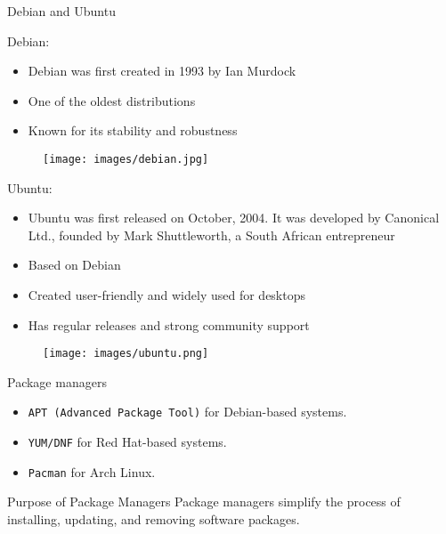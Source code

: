 \documentclass{beamer}
\begin{document}
\begin{frame}{Debian and Ubuntu}
  \begin{minipage}[t]{0.65\textwidth}
    Debian:
    \begin{itemize}
      \item Debian was first created in 1993 by Ian Murdock
      \item One of the oldest distributions
      \item Known for its stability and robustness
    \end{itemize}
  \end{minipage}
  \hfill
  \begin{minipage}[t]{0.3\textwidth}
    \begin{figure}[h]
      \texttt{[image: images/debian.jpg]}
    \end{figure}
  \end{minipage}

  \begin{minipage}[t]{0.65\textwidth}
    Ubuntu:
    \begin{itemize}
      \item Ubuntu was first released on October, 2004. It was developed by Canonical Ltd., founded by Mark Shuttleworth, a South African entrepreneur
      \item Based on Debian
      \item Created user-friendly and widely used for desktops
      \item Has regular releases and strong community support
    \end{itemize}
  \end{minipage}
  \hfill
  \begin{minipage}[t]{0.3\textwidth}
    \begin{figure}[h]
      \texttt{[image: images/ubuntu.png]}
    \end{figure}
  \end{minipage}
\end{frame}

\begin{frame}{Package managers}
  \begin{itemize}
    \item \texttt{APT (Advanced Package Tool)} for Debian-based systems.
    \item \texttt{YUM/DNF} for Red Hat-based systems.
    \item \texttt{Pacman} for Arch Linux.
  \end{itemize}
  \begin{block}{Purpose of Package Managers}
    Package managers simplify the process of installing, updating, and removing software packages.
  \end{block}
\end{frame}
\end{document}
